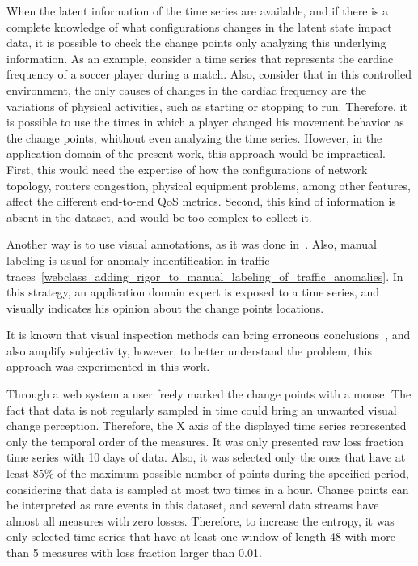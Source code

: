 When the latent information of the time series are available, and if there is a
complete knowledge of what configurations changes in the latent state impact
data, it is possible to check the change points only analyzing this underlying
information. As an example, consider a time series that represents the cardiac
frequency of a soccer player during a match. Also, consider that in this
controlled environment, the only causes of changes in the cardiac frequency are
the variations of physical activities, such as starting or stopping to run.
Therefore,
it is possible to use the times in which a player changed his movement behavior
as the change points, whithout even analyzing the time series. However, in the
application domain of the present work, this approach would be impractical.
First, this would need the expertise of how the configurations of network
topology, routers congestion, physical equipment problems, among other features,
affect the different end-to-end QoS metrics.
Second, this kind of information is absent in the dataset, and would be too
complex to collect it.

Another way is to use visual annotations,
as it was done
in~\cite{learning_sparse_penalties_for_change_point_detection_using_max_margin_interval_regression}.
Also, manual labeling is usual for anomaly indentification in traffic
traces~\ref{webclass_adding_rigor_to_manual_labeling_of_traffic_anomalies}.
In this strategy, an application domain expert is exposed to a time series,
and visually indicates his opinion about the change points locations.

It is known that visual inspection methods can bring erroneous
conclusions~\cite{leveraging_cloud_data_to_mitigate_user_experience_from_breaking_bad},
and also amplify subjectivity, however, to better understand the problem, this
approach was experimented in this work.

Through a web system a user freely marked the change points with a mouse.
The fact that data is not regularly sampled in time could bring an unwanted
visual change perception. Therefore, the X axis of the displayed time series
represented only the temporal order of the measures.
It was only presented raw
loss fraction time series with 10 days of data.
Also, it was selected only the ones that have at
least 85\% of the maximum possible number of points during the specified period,
considering that data is sampled at most two times in a hour. Change points can
be interpreted as rare events in this dataset, and several data streams have
almost
all measures with zero losses. Therefore, to increase the entropy,
it was only selected time series that have at least one window of length 48 with
more than 5 measures with loss fraction larger than 0.01.

